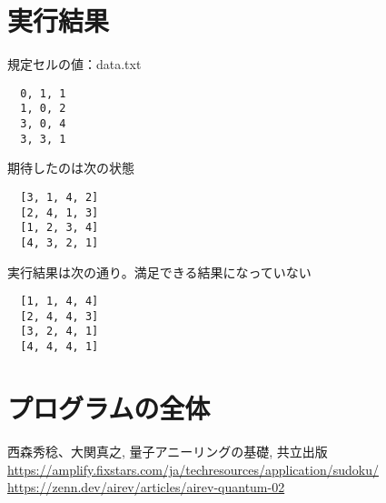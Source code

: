 \documentclass[uplatex,dvipdfmx,a4paper,11pt,oneside,openany]{jsbook}
\begin{document}

\section{実行結果}

規定セルの値：data.txt
\begin{verbatim}
  0, 1, 1
  1, 0, 2
  3, 0, 4
  3, 3, 1
\end{verbatim}

期待したのは次の状態
\begin{verbatim}
  [3, 1, 4, 2]
  [2, 4, 1, 3]
  [1, 2, 3, 4]
  [4, 3, 2, 1]
\end{verbatim}

実行結果は次の通り。満足できる結果になっていない
\begin{verbatim}
  [1, 1, 4, 4]
  [2, 4, 4, 3]
  [3, 2, 4, 1]
  [4, 4, 4, 1]
\end{verbatim}

\section{プログラムの全体}



\begin{thebibliography}{9}
   西森秀稔、大関真之, 量子アニーリングの基礎, 共立出版
   \url{https://amplify.fixstars.com/ja/techresources/application/sudoku/}
   \url{https://zenn.dev/airev/articles/airev-quantum-02}
\end{thebibliography}
\end{document}
